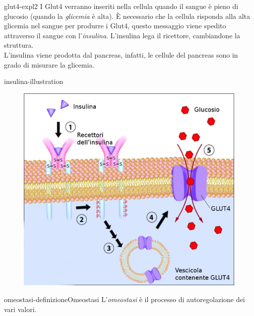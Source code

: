 \documentclass[preview]{standalone}
\begin{document}
\begin{snippet}{glut4-expl2}
    I Glut4 verranno inseriti nella cellula quando il sangue è pieno di glucosio (quando la \textit{glicemia} è alta).
È necessario che la cellula risponda alla alta glicemia nel sangue per produrre i Glut4,
questo messaggio viene spedito attraverso il sangue con l'\textit{insulina}.
L'insulina lega il ricettore, cambiandone la struttura. \\
L'insulina viene prodotta dal pancreas, infatti, le cellule del pancreas sono in grado di misurare la glicemia.
\end{snippet}

\begin{snippet}{insulina-illustration}
    \begin{center}
    \begin{figure}[h]
        \centering
        \includegraphics[width=\textwidth]{./resources/insulin.png}
    \end{figure}
    \end{center}
\end{snippet}


\begin{snippetdefinition}{omeostasi-definizione}{Omeostasi}
    L'\textit{omeostasi} è il processo di autoregolazione dei vari valori.
\end{snippetdefinition}
\end{document}
